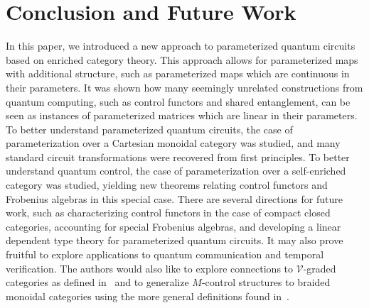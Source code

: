 \section{Conclusion and Future Work}

In this paper, we introduced a new approach to parameterized quantum circuits based on enriched category theory.
This approach allows for parameterized maps with additional structure, such as parameterized maps which are continuous in their parameters.
It was shown how many seemingly unrelated constructions from quantum computing, such as control functors and shared entanglement, can be seen as instances of parameterized matrices which are linear in their parameters.
To better understand parameterized quantum circuits, the case of parameterization over a Cartesian monoidal category was studied, and many standard circuit transformations were recovered from first principles.
To better understand quantum control, the case of parameterization over a self-enriched category was studied, yielding new theorems relating control functors and Frobenius algebras in this special case.
There are several directions for future work, such as characterizing control functors in the case of compact closed categories, accounting for special Frobenius algebras, and developing a linear dependent type theory for parameterized quantum circuits.
It may also prove fruitful to explore applications to quantum communication and temporal verification.
The authors would also like to explore connections to $\mathcal{V}$-graded categories as defined in~\cite{LucyshynWright2026} and to generalize $M$-control structures to braided monoidal categories using the more general definitions found in~\cite{KongZheng2018}.

